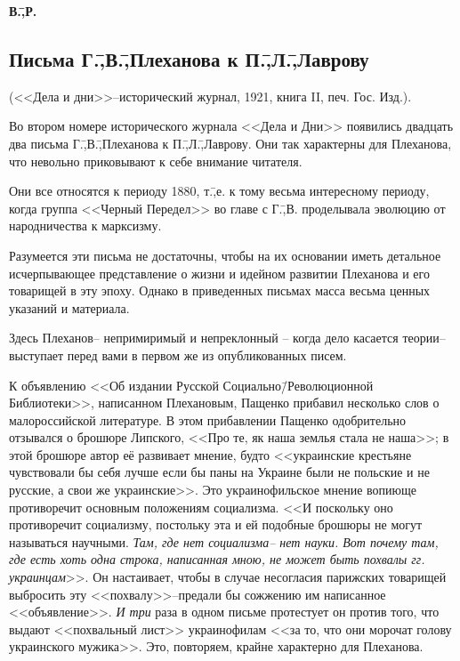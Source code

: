 \begin{flushright}
 \textbf{В.\=,Р.}\hspace*{2em}
\end{flushright}

\subsection*{Письма Г.\=,В.\=,Плеханова к П.\=,Л.\=,Лаврову}
\label{subsec:10.3}

(<<Дела и дни>>\---исторический журнал, 1921, книга II, печ. Гос. Изд.).

Во втором номере исторического журнала <<Дела и Дни>> появились двадцать два письма Г.\=,В.\=,Плеханова к П.\=,Л.\=,Лаврову. Они так характерны для Плеханова, что невольно приковывают к себе внимание читателя.

Они все относятся к периоду 1880, т.\=,е. к тому весьма интересному периоду, когда группа <<Черный Передел>> во главе с Г.\=,В. проделывала эволюцию от народничества к марксизму.

Разумеется эти письма не достаточны, чтобы на их основании иметь детальное исчерпывающее представление о жизни и идейном развитии Плеханова и его товарищей в эту эпоху. Однако в приведенных письмах масса весьма ценных указаний и материала.

Здесь Плеханов\--- непримиримый и непреклонный \--- когда дело касается теории\--- выступает перед вами в первом же из опубликованных писем.

К объявлению <<Об издании Русской Социально\=/Революционной Библиотеки>>, написанном Плехановым, Пащенко прибавил несколько слов о малороссийской литературе. В этом прибавлении Пащенко одобрительно отзывался о брошюре Липского, <<Про те, як наша землья стала не наша>>; в этой брошюре автор её развивает мнение, будто <<украинские крестьяне чувствовали бы себя лучше если бы паны на Украине были не польские и не русские, а свои же украинские>>. Это украинофильское мнение вопиюще противоречит основным положениям социализма. <<И поскольку оно противоречит социализму, постольку эта и ей подобные брошюры не могут называться научными. \emph{Там, где нет социализма\--- нет науки. Вот почему там, где есть хоть одна строка, написанная мною, не может быть похвалы гг. украинцам}>>. Он настаивает, чтобы в случае несогласия парижских товарищей выбросить эту <<похвалу>>\---предали бы сожжению им написанное <<объявление>>. \emph{И три} раза в одном письме протестует он против того, что выдают <<похвальный лист>> украинофилам <<за то, что они морочат голову украинского мужика>>. Это, повторяем, крайне характерно для Плеханова.

